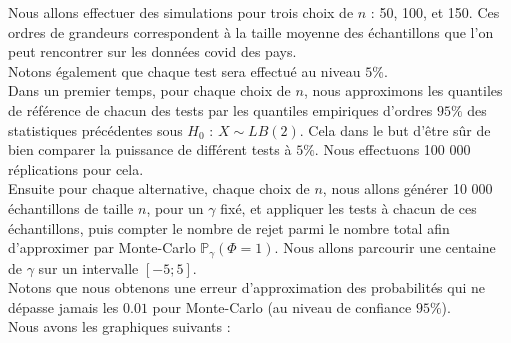 \documentclass[12pt,a4paper]{article}
\begin{document}
Nous allons effectuer des simulations pour trois choix de $n$ : 50, 100, et 150. Ces ordres de grandeurs correspondent à la taille moyenne des échantillons que l'on peut rencontrer sur les données covid des pays. \\
Notons également que chaque test sera effectué au niveau $5\%$. \\
Dans un premier temps, pour chaque choix de $n$, nous approximons les quantiles de référence de chacun des tests par les quantiles empiriques d'ordres $95\%$ des statistiques précédentes sous $H_{0}$ : $X \sim LB(2)$. Cela dans le but d'être sûr de bien comparer la puissance de différent tests à $5\%$. Nous effectuons 100 000 réplications pour cela. \\
Ensuite pour chaque alternative, chaque choix de $n$, nous allons générer 10 000 échantillons de taille $n$, pour un $\gamma$ fixé, et appliquer les tests à chacun de ces échantillons, puis compter le nombre de rejet parmi le nombre total afin d'approximer par Monte-Carlo $\mathbb{P}_{\gamma}(\Phi = 1)$. Nous allons parcourir une centaine de $\gamma$ sur un intervalle $[-5;5]$. \\

Notons que nous obtenons une erreur d'approximation des probabilités qui ne dépasse jamais les $0.01$ pour Monte-Carlo (au niveau de confiance $95 \%$). \\
Nous avons les graphiques suivants :
\end{document}
